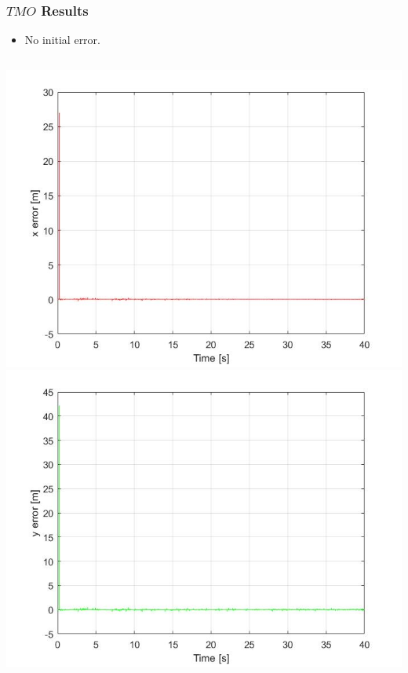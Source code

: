 \documentclass{beamer}
\begin{document}
	\begin{frame}
	\frametitle{$TMO$ Results}
	\begin{itemize}
		\item No initial error.
	\end{itemize}
		\begin{columns}[t]
			\centering
			\includegraphics[scale=0.18]{nlo_x_0}\\
			\includegraphics[scale=0.18]{nlo_y_0}
			\centering

\end{columns}
\end{frame}
\end{document}
